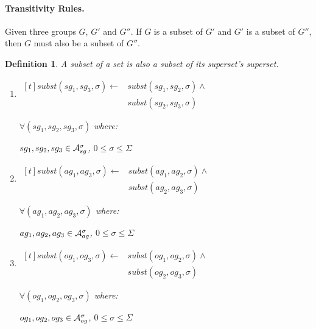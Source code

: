 \documentclass[10pt, twocolumn]{article}
\newtheorem{definition}{Definition}
\begin{document}
        \paragraph{Transitivity Rules.}

          Given three groups $G$, $G'$ and $G''$. If $G$ is a subset of $G'$
          and $G'$ is a subset of $G''$, then $G$ must also be a subset of
          $G''$.

          \begin{definition}
            A subset of a set is also a subset of its superset's superset.

            \begin{enumerate}
              \item
                \begin{math}
                  \begin{aligned}[t]
                    subst(sg_{1}, sg_{3}, \sigma) \leftarrow &
                    subst(sg_{1}, sg_{2}, \sigma) \land \\
                    & subst(sg_{2}, sg_{3}, \sigma)
                  \end{aligned}
                \end{math}

                $\forall (sg_{1}, sg_{2}, sg_{3}, \sigma)$ where:

                $sg_{1}, sg_{2}, sg_{3} \in {\cal A}^{\sigma}_{sg}$,
                $0 \leq \sigma \leq \Sigma$
              \item
                \begin{math}
                  \begin{aligned}[t]
                    subst(ag_{1}, ag_{3}, \sigma) \leftarrow &
                    subst(ag_{1}, ag_{2}, \sigma) \land \\
                    & subst(ag_{2}, ag_{3}, \sigma)
                  \end{aligned}
                \end{math}

                $\forall (ag_{1}, ag_{2}, ag_{3}, \sigma)$ where:

                $ag_{1}, ag_{2}, ag_{3} \in {\cal A}^{\sigma}_{ag}$,
                $0 \leq \sigma \leq \Sigma$
              \item
                \begin{math}
                  \begin{aligned}[t]
                    subst(og_{1}, og_{3}, \sigma) \leftarrow &
                    subst(og_{1}, og_{2}, \sigma) \land \\
                    & subst(og_{2}, og_{3}, \sigma)
                  \end{aligned}
                \end{math}

                $\forall (og_{1}, og_{2}, og_{3}, \sigma)$ where:

                $og_{1}, og_{2}, og_{3} \in {\cal A}^{\sigma}_{og}$,
                $0 \leq \sigma \leq \Sigma$

            \end{enumerate}
          \end{definition}
\end{document}
